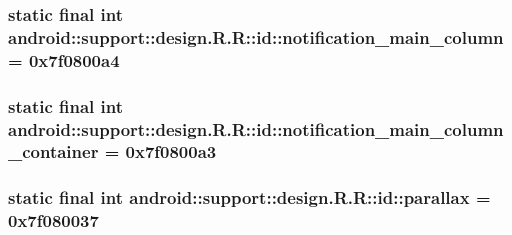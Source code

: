 \hypertarget{classandroid_1_1support_1_1design_1_1_r_1_1id_34aa8e9a68070b268bad3901b7028fee}{
\subsubsection[{notification\_\-main\_\-column}]{\setlength{\rightskip}{0pt plus 5cm}static final int android::support::design.R.R::id::notification\_\-main\_\-column = 0x7f0800a4}}
\label{classandroid_1_1support_1_1design_1_1_r_1_1id_34aa8e9a68070b268bad3901b7028fee}


\hypertarget{classandroid_1_1support_1_1design_1_1_r_1_1id_cfd2f71d2070744a3d933f87c77ef385}{
\subsubsection[{notification\_\-main\_\-column\_\-container}]{\setlength{\rightskip}{0pt plus 5cm}static final int android::support::design.R.R::id::notification\_\-main\_\-column\_\-container = 0x7f0800a3}}
\label{classandroid_1_1support_1_1design_1_1_r_1_1id_cfd2f71d2070744a3d933f87c77ef385}


\hypertarget{classandroid_1_1support_1_1design_1_1_r_1_1id_284a929cd4bf5c4d98ea7824158c9d90}{
\subsubsection[{parallax}]{\setlength{\rightskip}{0pt plus 5cm}static final int android::support::design.R.R::id::parallax = 0x7f080037}}
\label{classandroid_1_1support_1_1design_1_1_r_1_1id_284a929cd4bf5c4d98ea7824158c9d90}


